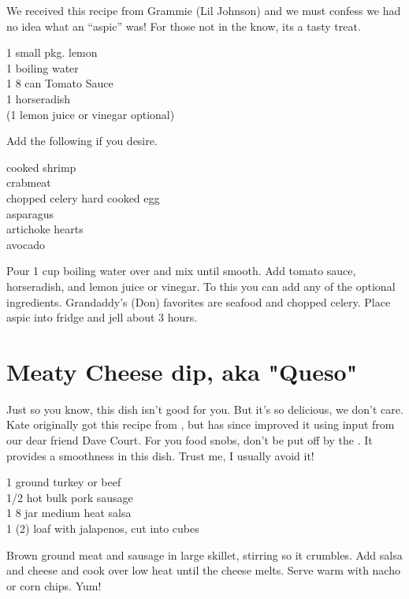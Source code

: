 \begin{open}
  We received this recipe from Grammie (Lil Johnson) and we must confess
  we had no idea what an ``aspic'' was!  For those not in the know, its a tasty
  treat.
\end{open}
\begin{ingredients}
  1 small pkg. lemon \\
  \SI{1}{\cup} boiling water \\
  1 \SI{8}{\ounce} can  Tomato Sauce \\
  \SI{1}{\teaspoon} horseradish \\
  (\SI{1}{\teaspoon} lemon juice or vinegar optional)
\end{ingredients}
Add the following if you desire.
\begin{ingredients}
  cooked shrimp \\
  crabmeat \\
  chopped celery
  hard cooked egg \\
  asparagus \\
  artichoke hearts \\
  avocado
\end{ingredients}
Pour 1 cup boiling water over  and mix until smooth. Add tomato
sauce, horseradish, and lemon juice or vinegar.  To this you can add any of
the optional ingredients. Grandaddy's (Don) favorites are seafood and chopped
celery. Place aspic into fridge and jell about 3 hours.

\section{Meaty Cheese dip, aka "Queso"}

\begin{open}
  Just so you know, this dish isn't good for you. But it's so delicious,
  we don't care. Kate originally got this recipe from , but has
since improved it using input from our dear friend Dave Court.  For you
  food snobs, don't be put off by the .  It provides a
  smoothness in this dish. Trust me, I usually avoid it!
\end{open}
\begin{ingredients}
  \SI{1}{\pound} ground turkey or beef\\
  \SI{1/2}{\pound} hot bulk pork sausage\\
  1 \SI{8}{\ounce} jar medium heat salsa\\
  1 (\SI{2}{\pound}) loaf  with jalapenos, cut into cubes
\end{ingredients}
Brown ground meat and sausage in large skillet, stirring so it crumbles. Add
salsa and cheese and cook over low heat until the cheese melts. Serve warm
with nacho or corn chips. Yum!


